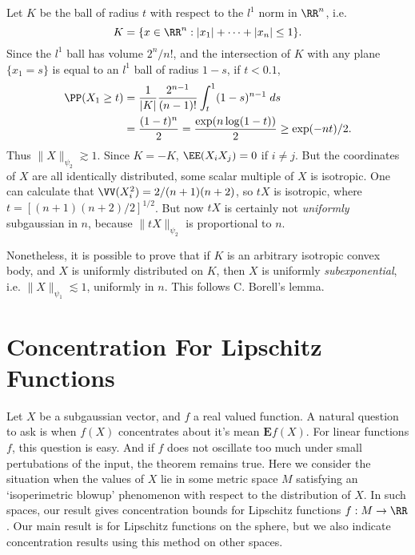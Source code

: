 \begin{example}
    Let $K$ be the ball of radius $t$ with respect to the $l^1$ norm in $\RR^n$, i.e.
    \[ K = \{ x \in \RR^n: |x_1| + \dots + |x_n| \leq 1 \}. \]
    Since the $l^1$ ball has volume $2^n/n!$, and the intersection of $K$ with any plane $\{ x_1 = s \}$ is equal to an $l^1$ ball of radius $1 - s$, if $t < 0.1$,
    \begin{align*}
        \PP(X_1 \geq t) &= \frac{1}{|K|} \frac{2^{n-1}}{(n-1)!} \int_t^1 (1-s)^{n-1}\; ds\\
        &= \frac{(1 - t)^n}{2} = \frac{\exp(n \log(1-t))}{2} \geq \exp(-nt)/2.
    \end{align*}
    Thus $\| X \|_{\psi_2} \gtrsim 1$. Since $K = -K$, $\EE(X_iX_j) = 0$ if $i \neq j$. But the coordinates of $X$ are all identically distributed, some scalar multiple of $X$ is isotropic. One can calculate that $\VV(X_i^2) = 2/(n+1)(n+2)$, so $tX$ is isotropic, where $t = [(n+1)(n+2)/2]^{1/2}$. But now $tX$ is certainly not \emph{uniformly} subgaussian in $n$, because $\| tX \|_{\psi_2}$ is proportional to $n$.
\end{example}

Nonetheless, it is possible to prove that if $K$ is an arbitrary isotropic convex body, and $X$ is uniformly distributed on $K$, then $X$ is uniformly \emph{subexponential}, i.e. $\| X \|_{\psi_1} \lesssim 1$, uniformly in $n$. This follows C. Borell's lemma.









\section{Concentration For Lipschitz Functions}

Let $X$ be a subgaussian vector, and $f$ a real valued function. A natural question to ask is when $f(X)$ concentrates about it's mean $\mathbf{E} f(X)$. For linear functions $f$, this question is easy. And if $f$ does not oscillate too much under small pertubations of the input, the theorem remains true. Here we consider the situation when the values of $X$ lie in some metric space $M$ satisfying an `isoperimetric blowup' phenomenon with respect to the distribution of $X$. In such spaces, our result gives concentration bounds for Lipschitz functions $f: M \to \RR$. Our main result is for Lipschitz functions on the sphere, but we also indicate concentration results using this method on other spaces.

